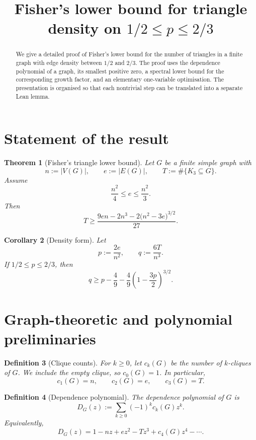 \documentclass[11pt]{article}
\title{Fisher's lower bound for triangle density on \(1/2\le p\le 2/3\)}
\author{}
\date{}
\newtheorem{theorem}{Theorem}[section]
\newtheorem{corollary}[theorem]{Corollary}
\newtheorem{definition}[theorem]{Definition}
\newcommand{\V}{V}
\newcommand{\E}{E}
\begin{document}
\maketitle

\begin{abstract}
We give a detailed proof of Fisher's lower bound for the number of
triangles in a finite graph with edge density between \(1/2\) and \(2/3\).
The proof uses the dependence polynomial of a graph, its smallest positive
zero, a spectral lower bound for the corresponding growth factor, and an
elementary one-variable optimisation.  The presentation is organised so that
each nontrivial step can be translated into a separate Lean lemma.
\end{abstract}

\section{Statement of the result}

\begin{theorem}[Fisher's triangle lower bound]
\label{thm:fisher-finite}
Let \(G\) be a finite simple graph with
\[
        n := |\V(G)|,\qquad e := |\E(G)|,\qquad T := \#\{K_3\subseteq G\}.
\]
Assume
\[
        \frac{n^2}{4}\le e\le \frac{n^2}{3}.
\]
Then
\[
        T
        \ge
        \frac{9en-2n^3-2\bigl(n^2-3e\bigr)^{3/2}}{27}.
\]
\end{theorem}

\begin{corollary}[Density form]
\label{cor:density-form}
Let
\[
        p := \frac{2e}{n^2},
        \qquad
        q := \frac{6T}{n^3}.
\]
If \(1/2\le p\le 2/3\), then
\[
        q
        \ge
        p-\frac49-\frac49\left(1-\frac{3p}{2}\right)^{3/2}.
\]
\end{corollary}

\section{Graph-theoretic and polynomial preliminaries}

\begin{definition}[Clique counts]
For \(k\ge 0\), let \(c_k(G)\) be the number of \(k\)-cliques of \(G\).
We include the empty clique, so \(c_0(G)=1\).  In particular,
\[
        c_1(G)=n,\qquad c_2(G)=e,\qquad c_3(G)=T.
\]
\end{definition}

\begin{definition}[Dependence polynomial]
The dependence polynomial of \(G\) is
\[
        D_G(z)
        :=
        \sum_{k\ge 0}(-1)^k c_k(G)z^k.
\]
Equivalently,
\[
        D_G(z)=1-nz+ez^2-Tz^3+c_4(G)z^4-\cdots.
\]
\end{definition}
\end{document}

